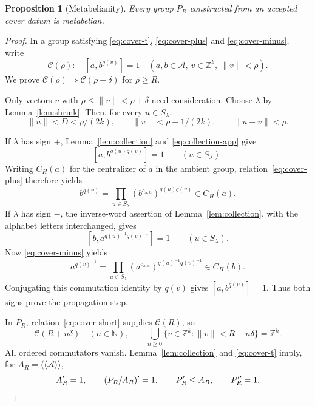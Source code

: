 \documentclass[10pt,a4paper]{amsart}
\newtheorem{proposition}{Proposition}
\newcommand{\N}{\mathbb N}
\newcommand{\Z}{\mathbb Z}
\newcommand{\nc}[1]{\langle\!\langle #1\rangle\!\rangle}
\newcommand{\norm}[1]{\lVert #1\rVert}
\begin{document}
\begin{proposition}[Metabelianity]
\label{prop:sound}
Every group $P_R$ constructed from an accepted cover datum is metabelian.
\end{proposition}

\begin{proof}
In a group satisfying \eqref{eq:cover-t}, \eqref{eq:cover-plus} and
\eqref{eq:cover-minus}, write
\[
 \mathcal C(\rho):\quad
 [a,b^{q(v)}]=1\quad
 (a,b\in\mathcal A,\ v\in\Z^k,\ \norm v<\rho).
\]
We prove $\mathcal C(\rho)\Rightarrow\mathcal C(\rho+\delta)$ for $\rho\ge R$.

Only vectors $v$ with $\rho\le\norm v<\rho+\delta$ need consideration.
Choose $\lambda$ by Lemma~\ref{lem:shrink}. Then, for every
$u\in S_\lambda$,
\begin{equation}
\label{eq:collection-app}
 \norm u<D<\rho/(2k),\qquad
 \norm v<\rho+1/(2k),\qquad
 \norm{u+v}<\rho.
\end{equation}

If $\lambda$ has sign $+$, Lemma~\ref{lem:collection} and
\eqref{eq:collection-app} give
\[
 [a,b^{q(u)q(v)}]=1\qquad(u\in S_\lambda).
\]
Writing $C_H(a)$ for the centralizer of $a$ in the ambient group,
relation~\eqref{eq:cover-plus} therefore yields
\[
 b^{q(v)}
 =\prod_{u\in S_\lambda}(b^{c_{\lambda,u}})^{q(u)q(v)}
 \in C_H(a).
\]
If $\lambda$ has sign $-$, the inverse-word assertion of
Lemma~\ref{lem:collection}, with the alphabet letters interchanged, gives
\[
 [b,a^{q(u)^{-1}q(v)^{-1}}]=1\qquad(u\in S_\lambda).
\]
Now \eqref{eq:cover-minus} yields
\[
 a^{q(v)^{-1}}
 =\prod_{u\in S_\lambda}(a^{c_{\lambda,u}})^{q(u)^{-1}q(v)^{-1}}
 \in C_H(b).
\]
Conjugating this commutation identity by $q(v)$ gives
$[a,b^{q(v)}]=1$. Thus both signs prove the propagation step.

In $P_R$, relation~\eqref{eq:cover-short} supplies $\mathcal C(R)$, so
\[
 \mathcal C(R+n\delta)\quad(n\in\N),\qquad
 \bigcup_{n\ge0}\{v\in\Z^k:\norm v<R+n\delta\}=\Z^k.
\]
All ordered commutators vanish. Lemma~\ref{lem:collection} and
\eqref{eq:cover-t} imply, for $A_R=\nc{\mathcal A}$,
\[
 A_R'=1,\qquad (P_R/A_R)'=1,\qquad
 P_R'\le A_R,\qquad P_R''=1.\qedhere
\]
\end{proof}
\end{document}
